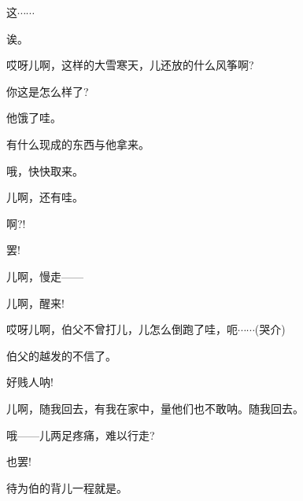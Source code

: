 {{这$\cdots{}\cdots{}$}

{诶。}\hspace{30pt}~

{哎呀儿啊，这样的大雪寒天，儿还放的什么风筝啊?}

{你这是怎么样了?}

{他饿了哇。}

{有什么现成的东西与他拿来。}

{哦，快快取来。}

{儿啊，还有哇。}

{啊?!}\hspace{30pt}~


{罢!}\hspace{30pt}~



{\vspace{5pt}}

{儿啊，慢走------}



{\vspace{5pt}}

{儿啊，醒来!}

{哎呀儿啊，伯父不曾打儿，儿怎么倒跑了哇，呃$\cdots{}\cdots{}$({\hwfs 哭}{\hwfs 介})}

{伯父的越发的不信了。}

{好贱人呐!}


{儿啊，随我回去，有我在家中，量他们也不敢呐。随我回去。}

{哦------儿两足疼痛，难以行走?}

{也罢!}\hspace{20pt}~

{待为伯的背儿一程就是。}

}
